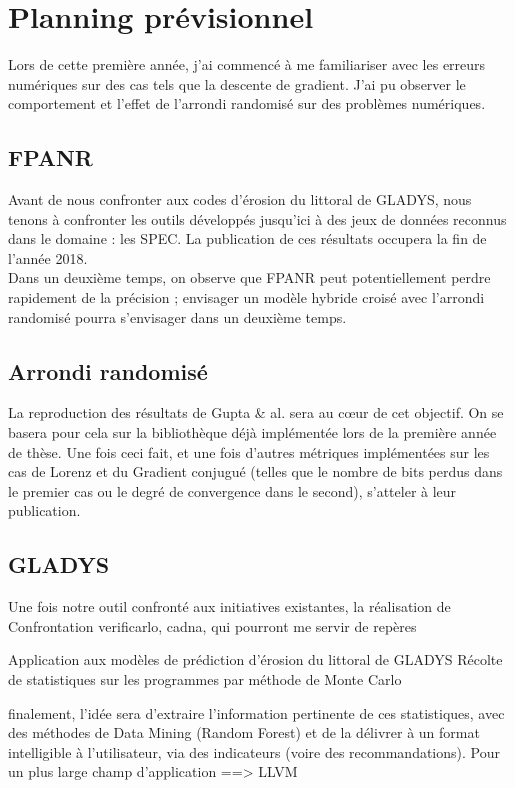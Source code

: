 \documentclass[a4paper,11pt]{article}
\begin{document}
\section{Planning prévisionnel}
Lors de cette première année, j'ai commencé à me familiariser avec les erreurs numériques sur des cas tels que la descente de gradient.
J'ai pu observer le comportement et l’effet de l’arrondi randomisé sur des problèmes numériques.

\subsection{FPANR}
Avant de nous confronter aux codes d'érosion du littoral de GLADYS, nous tenons à confronter les outils développés jusqu'ici à des jeux de données reconnus dans le domaine : les SPEC. La publication de ces résultats occupera la fin de l'année 2018. \\
Dans un deuxième temps, on observe que FPANR peut potentiellement perdre rapidement de la précision ; envisager un modèle hybride croisé avec l'arrondi randomisé pourra s'envisager dans un deuxième temps.

\subsection{Arrondi randomisé}
La reproduction des résultats de Gupta & al.\cite{gupta2015deep} sera au cœur de cet objectif. On se basera pour cela sur la bibliothèque déjà implémentée lors de la première année de thèse. Une fois ceci fait, et une fois d'autres métriques implémentées sur les cas de Lorenz et du Gradient conjugué (telles que le nombre de bits perdus dans le premier cas ou le degré de convergence dans le second), s'atteler à leur publication.

\subsection{GLADYS}
Une fois notre outil confronté aux initiatives existantes, la réalisation de 
Confrontation
verificarlo, cadna, qui pourront me servir de repères

Application aux modèles de prédiction d’érosion du littoral de GLADYS
Récolte de statistiques sur les programmes par méthode de Monte Carlo

finalement, l’idée sera d’extraire l’information pertinente de ces statistiques, avec des méthodes de Data Mining (Random Forest)
et de la délivrer à un format intelligible à l’utilisateur, via des indicateurs (voire des recommandations).
Pour un plus large champ d’application  ==> LLVM
\end{document}
